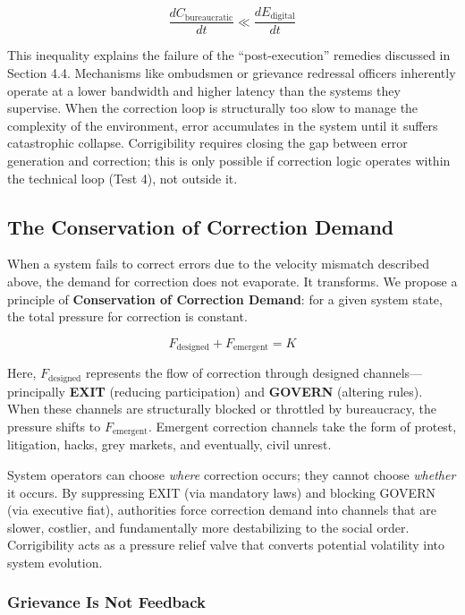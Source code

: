 \documentclass{article}
\begin{document}
\begin{equation}
\frac{dC_{\text{bureaucratic}}}{dt} \ll \frac{dE_{\text{digital}}}{dt}
\end{equation}

This inequality explains the failure of the ``post-execution'' remedies discussed in Section 4.4. Mechanisms like ombudsmen or grievance redressal officers inherently operate at a lower bandwidth and higher latency than the systems they supervise. When the correction loop is structurally too slow to manage the complexity of the environment, error accumulates in the system until it suffers catastrophic collapse. Corrigibility requires closing the gap between error generation and correction; this is only possible if correction logic operates within the technical loop (Test 4), not outside it.

\subsection{The Conservation of Correction Demand}

When a system fails to correct errors due to the velocity mismatch described above, the demand for correction does not evaporate. It transforms. We propose a principle of \textbf{Conservation of Correction Demand}: for a given system state, the total pressure for correction is constant.

\begin{equation}
F_{\text{designed}} + F_{\text{emergent}} = K
\end{equation}

Here, $F_{\text{designed}}$ represents the flow of correction through designed channels---principally \textbf{EXIT} (reducing participation) and \textbf{GOVERN} (altering rules). When these channels are structurally blocked or throttled by bureaucracy, the pressure shifts to $F_{\text{emergent}}$. Emergent correction channels take the form of protest, litigation, hacks, grey markets, and eventually, civil unrest.

System operators can choose \textit{where} correction occurs; they cannot choose \textit{whether} it occurs. By suppressing EXIT (via mandatory laws) and blocking GOVERN (via executive fiat), authorities force correction demand into channels that are slower, costlier, and fundamentally more destabilizing to the social order. Corrigibility acts as a pressure relief valve that converts potential volatility into system evolution.

\subsubsection{Grievance Is Not Feedback}
\end{document}
